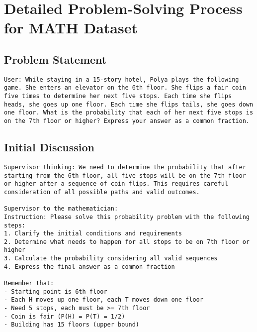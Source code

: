 \section{Detailed Problem-Solving Process for MATH Dataset}\label{appendix:math-problem}

\subsection{Problem Statement}
\vspace{-0.5em}
\begin{userbox}
\begin{lstlisting}
User: While staying in a 15-story hotel, Polya plays the following game. She enters an elevator on the 6th floor. She flips a fair coin five times to determine her next five stops. Each time she flips heads, she goes up one floor. Each time she flips tails, she goes down one floor. What is the probability that each of her next five stops is on the 7th floor or higher? Express your answer as a common fraction.
\end{lstlisting}
\end{userbox}

\subsection{Initial Discussion}
\vspace{-0.5em}
\begin{supervisorbox}
\begin{lstlisting}
Supervisor thinking: We need to determine the probability that after starting from the 6th floor, all five stops will be on the 7th floor or higher after a sequence of coin flips. This requires careful consideration of all possible paths and valid outcomes.

Supervisor to the mathematician:
Instruction: Please solve this probability problem with the following steps:
1. Clarify the initial conditions and requirements
2. Determine what needs to happen for all stops to be on 7th floor or higher
3. Calculate the probability considering all valid sequences
4. Express the final answer as a common fraction

Remember that:
- Starting point is 6th floor
- Each H moves up one floor, each T moves down one floor
- Need 5 stops, each must be >= 7th floor
- Coin is fair (P(H) = P(T) = 1/2)
- Building has 15 floors (upper bound)

\end{lstlisting}
\end{supervisorbox}

